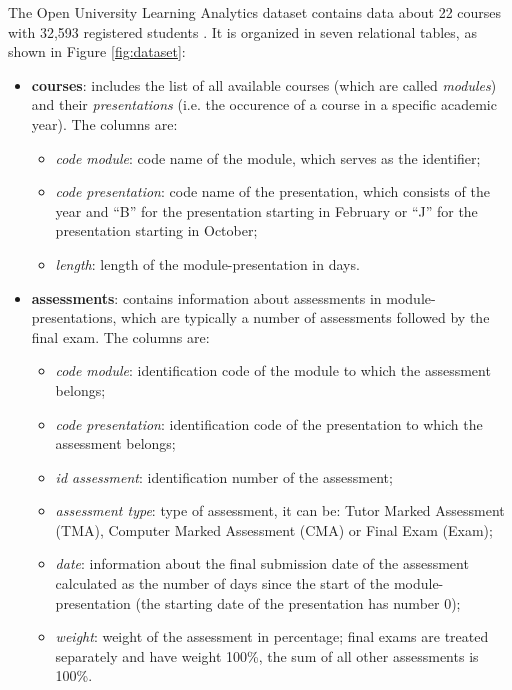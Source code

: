 \documentclass{article}
\begin{document}
The Open University Learning Analytics dataset contains data about 22 courses with 32,593 registered students \cite{dataset}. It is organized in seven relational tables, as shown in Figure \ref{fig:dataset}:
\begin{itemize}
    \item \textbf{courses}: includes the list of all available courses (which are called \textit{modules}) and their \textit{presentations} (i.e. the occurence of a course in a specific academic year). The columns are:
    \begin{itemize}
        \item \textit{code module}: code name of the module, which serves as the identifier;
        \item \textit{code presentation}: code name of the presentation, which consists of the year and “B” for the presentation starting in February or “J” for the presentation starting in October;
        \item \textit{length}: length of the module-presentation in days.
    \end{itemize}

    \item \textbf{assessments}: contains information about assessments in module-presentations, which are typically a number of assessments followed by the final exam. The columns are:
    \begin{itemize}
        \item \textit{code module}: identification code of the module to which the assessment belongs;
        \item \textit{code presentation}: identification code of the presentation to which the assessment belongs;
        \item \textit{id assessment}: identification number of the assessment;
        \item \textit{assessment type}: type of assessment, it can be: Tutor Marked Assessment (TMA), Computer Marked Assessment (CMA) or Final Exam (Exam);
        \item \textit{date}: information about the final submission date of the assessment calculated as the number of days since the start of the module-presentation (the starting date of the presentation has number 0);
        \item \textit{weight}: weight of the assessment in percentage; final exams are treated separately and have weight 100\%, the sum of all other assessments is 100\%.  
    \end{itemize}
    

\end{itemize}
\end{document}
